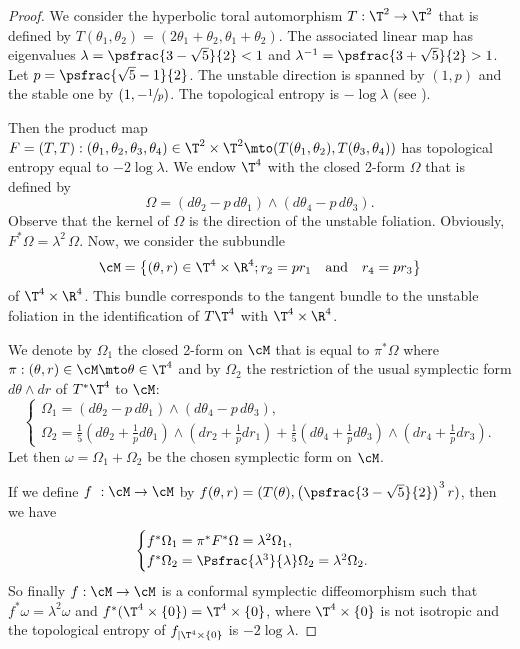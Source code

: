 \begin{proof}
We consider the hyperbolic toral automorphism
$T:\T^2\to \T^2$ that is defined by
$T(\theta_1, \theta_2)=(2\theta_1+\theta_2, \theta_1+\theta_2)$. The
associated linear map has eigenvalues $\lambda=\psfrac{3-\sqrt{5}}{2}<1$ and
$\lambda^{-1}=\psfrac{3+\sqrt{5}}{2}>1$. Let $p = \psfrac{\sqrt{5}-1}{2}$. The unstable
direction is spanned by $(1, p)$ and the stable
one by $(1, -\sfrac{1}{p})$. The topological entropy is
$-\log \lambda$ (see \cite{HaKa1995}).

Then the product map
$F=(T, T):(\theta_1, \theta_2, \theta_3, \theta_4)\in\T^2\times
\T^2\mto (T(\theta_1, \theta_2), T(\theta_3, \theta_4))$ has topological entropy equal to
$-2\log \lambda$. We endow $\T^4$ with the
closed 2-form $\Omega$ that is defined by
\[
\Omega=(d\theta_2 - p \, d \theta_1)\wedge
(d\theta_4 - p \, d\theta_3).
\]
Observe that the kernel of $\Omega$ is the direction of the unstable
foliation. Obviously,
$F^*\Omega= \lambda^2\, \Omega$. Now, we
consider the subbundle
\[
{\cM}=\left\{ (\theta, r)\in \T^4\times \R^4;
r_2= p r_1\quad\text{and}\quad
r_4=p r_3\right\}
\]
of $\T^4\times\R^4$. This bundle
corresponds to the tangent bundle to the unstable foliation in the
identification of $T\T^4$ with $\T^4\times \R^4$.

We denote by $\Omega_1$ the closed 2-form on ${\cM}$ that is equal to
$\pi^*\Omega$ where $\pi: (\theta, r)\in{\cM}\mto \theta\in\T^4$
and by $\Omega_2$ the restriction of the usual symplectic form
$d\theta\wedge dr$ of $T^*\T^4$ to ${\cM}$:
\[
\begin{cases}
\Omega_1=(d\theta_2-p \, d\theta_1)\wedge
(d\theta_4-p\, d\theta_3),
\\
\Omega_2=\frac{1}{5}(d\theta_2+ \frac{1}{p} d\theta_1)\wedge (dr_2+ \frac{1}{p}dr_1)+
\frac{1}{5}(d\theta_4+ \frac{1}{p}d\theta_3)\wedge
(dr_4+\frac{1}{p} dr_3).
\end{cases}
\]
Let then $\omega=\Omega_1+\Omega_2$ be the chosen symplectic form on
${\cM}$.

If we define $f~:{\cM}\to {\cM}$ by
$f(\theta, r)=(T(\theta),\left(\psfrac{3-\sqrt{5}}{2}\right)^3r)$,
then we have\vspace*{-3pt}
\[
\begin{cases}
f^*\Omega_1= \pi^*F^*\Omega =\lambda^2\Omega_1,
\\
f^*\Omega_2 = \Psfrac{\lambda^3}{\lambda} \Omega_2 =
\lambda^2\Omega_2.
\end{cases}
\]
So finally $f:{\cM}\to {\cM}$ is a conformal symplectic
diffeomorphism such that
$f^*\omega=\lambda^2\omega$ and
$f^*(\T^4\times \{ 0\})=\T^4\times \{ 0\}$, where $\T^4\times \{ 0\}$
is not isotropic and the topological entropy of
$f_{|\T^4\times \{ 0\}}$ is $-2\log \lambda$.
\end{proof}

